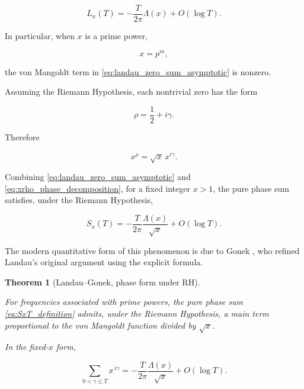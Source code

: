 \documentclass[11pt]{amsart}
\numberwithin{equation}{section}
\theoremstyle{plain}
\newtheorem{theorem}{Theorem}[section]
\theoremstyle{definition}
\theoremstyle{remark}
\begin{document}
\begin{equation}
L_x(T)
=
-
\frac{T}{2\pi}
\Lambda(x)
+
O(\log T).
\label{eq:landau_zero_sum_asymptotic}
\end{equation}

In particular, when \(x\) is a prime power,

\begin{equation}
x=p^m,
\label{eq:prime_power_condition}
\end{equation}

the von Mangoldt term in \eqref{eq:landau_zero_sum_asymptotic} is
nonzero.

Assuming the Riemann Hypothesis, each nontrivial zero has the form

\begin{equation}
\rho
=
\frac{1}{2}
+
i\gamma.
\label{eq:RH_zero_decomposition}
\end{equation}

Therefore

\begin{equation}
x^\rho
=
\sqrt{x}\,x^{i\gamma}.
\label{eq:xrho_phase_decomposition}
\end{equation}

Combining \eqref{eq:landau_zero_sum_asymptotic} and
\eqref{eq:xrho_phase_decomposition}, for a fixed integer \(x>1\),
the pure phase sum satisfies, under the Riemann Hypothesis,

\begin{equation}
S_x(T)
=
-
\frac{T}{2\pi}
\frac{\Lambda(x)}{\sqrt{x}}
+
O(\log T).
\label{eq:landau_phase_sum_asymptotic}
\end{equation}


The modern quantitative form of this phenomenon is due to Gonek
\cite{Gonek1984},
who refined Landau's original argument using the explicit formula.

\begin{theorem}[Landau--Gonek, phase form under RH]
\label{thm:landau_gonek_formula}

For frequencies associated with prime powers,
the pure phase sum \eqref{eq:SxT_definition} admits, under the Riemann
Hypothesis, a main term proportional to the von Mangoldt function
divided by \(\sqrt{x}\).

In the fixed-\(x\) form,

\begin{equation}
\sum_{0<\gamma\le T}
x^{\,i\gamma}
=
-
\frac{T}{2\pi}
\frac{\Lambda(x)}{\sqrt{x}}
+
O(\log T).
\label{eq:landau_gonek_asymptotic}
\end{equation}

\end{theorem}
\end{document}
